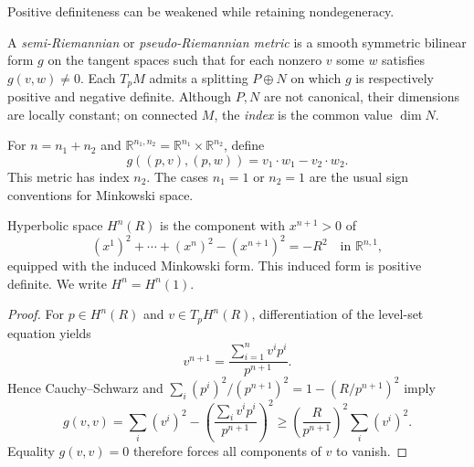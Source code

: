 Positive definiteness can be weakened while retaining nondegeneracy.

\begin{definition}
  \label{def:pet-ch1-pseudo-riemannian}


  A \emph{semi-Riemannian} or \emph{pseudo-Riemannian metric} is a smooth
  symmetric bilinear form $g$ on the tangent spaces such that for each nonzero
  $v$ some $w$ satisfies $g(v,w)\ne0$. Each $T_pM$ admits a splitting
  $P\oplus N$ on which $g$ is respectively positive and negative definite.
  Although $P,N$ are not canonical, their dimensions are locally constant;
  on connected $M$, the \emph{index} is the common value $\dim N$.
\end{definition}

\begin{example}
  \label{ex:pet-ch1-minkowski}


  For $n=n_1+n_2$ and
  $\mathbb{R}^{n_1,n_2}=\mathbb{R}^{n_1}\times\mathbb{R}^{n_2}$, define
  \[
    g((p,v),(p,w))=v_1\cdot w_1-v_2\cdot w_2.
  \]
  This metric has index $n_2$. The cases $n_1=1$ or $n_2=1$ are the usual
  sign conventions for Minkowski space.
\end{example}

\begin{example}
  \label{ex:pet-ch1-hyperbolic-space}


  Hyperbolic space $H^n(R)$ is the component with $x^{n+1}>0$ of
  \[
    (x^1)^2+\cdots+(x^n)^2-(x^{n+1})^2=-R^2
      \quad\text{in }\mathbb{R}^{n,1},
  \]
  equipped with the induced Minkowski form. This induced form is positive
  definite. We write $H^n=H^n(1)$.
\end{example}
\begin{proof}

  \sketch
  For $p\in H^n(R)$ and $v\in T_pH^n(R)$, differentiation of the level-set
  equation yields
  \[
    v^{n+1}=\frac{\sum_{i=1}^n v^ip^i}{p^{n+1}}.
  \]
  Hence Cauchy--Schwarz and
  $\sum_i(p^i)^2/(p^{n+1})^2=1-(R/p^{n+1})^2$ imply
  \[
    g(v,v)=\sum_i(v^i)^2-
      \left(\frac{\sum_i v^ip^i}{p^{n+1}}\right)^2
      \ge \left(\frac{R}{p^{n+1}}\right)^2\sum_i(v^i)^2.
  \]
  Equality $g(v,v)=0$ therefore forces all components of $v$ to vanish.
\end{proof}


